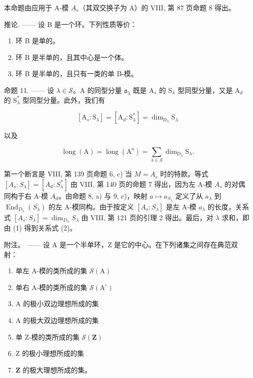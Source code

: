 本命题由应用于 A-模 \(A_{s}\)（其双交换子为 A）的 VIII, 第 87 页命题 8 得出。

推论. —— 设 B 是一个环。下列性质等价：

\begin{enumerate}
\def\labelenumi{(\roman{enumi})}
\item
  环 B 是单的。
\item
  环 B 是半单的，且其中心是一个体。
\item
  环 B 是半单的，且只有一类的单 B-模。
\end{enumerate}

命题 11. —— 设 \(\lambda \in \mathcal{S}\)。A 的同型分量 \(\mathfrak{a}_{\lambda}\) 既是 \(\mathrm{A}_s\) 的 \(\mathrm{S}_{\lambda}\) 型同型分量，又是 \(\mathrm{A}_d\) 的 \(\mathrm{S}_{\lambda}^{*}\) 型同型分量。此外，我们有

\[
[ \mathrm{A} _ {s}: \mathrm{S} _ {\lambda} ] = [ \mathrm{A} _ {d}: \mathrm{S} _ {\lambda} ^ {*} ] = \dim_ {\mathrm{D} _ {\lambda}} \mathrm{S} _ {\lambda}\tag{1}
\]

以及

\[
\operatorname{long} (\mathrm{A}) = \operatorname{long} \left(\mathrm{A} ^ {\mathrm{o}}\right) = \sum_ {\lambda \in \mathscr {S}} \dim_ {\mathrm{D} _ {\lambda}} \mathrm{S} _ {\lambda}.\tag{2}
\]

第一个断言是 VIII, 第 139 页命题 6, c) 当 \(M = A_{s}\) 时的特款。等式 \([A_{s} : S_{\lambda}] = [A_{d} : S_{\lambda}^{*}]\) 由 VIII, 第 140 页的命题 7 得出，因为左 A-模 \(A_{s}\) 的对偶同构于右 A-模 \(A_{d}\)。由命题 8, a) 与 9, c)，映射 \(a \mapsto a_{S_{\lambda}}\) 定义了从 \(a_{\lambda}\) 到 \(\operatorname{End}_{D_{\lambda}}(S_{\lambda})\) 的左 A-模同构。由于按定义 \([A_{s} : S_{\lambda}]\) 是左 A-模 \(a_{\lambda}\) 的长度，关系式 \([A_{s} : S_{\lambda}] = \dim_{D_{\lambda}} S_{\lambda}\) 由 VIII, 第 121 页的引理 2 得出。最后，对 \(\lambda\) 求和，即由 (1) 得到关系式 (2)。

附注。 —— 设 A 是一个半单环，Z 是它的中心。在下列诸集之间存在典范双射：

\begin{enumerate}
\def\labelenumi{\alph{enumi})}
\item
  单左 A-模的类所成的集 \(\mathcal{S}(\mathrm{A})\)
\item
  单右 A-模的类所成的集 \(\mathcal{S}(\mathrm{A}^{\circ})\)
\item
  A 的极小双边理想所成的集
\item
  A 的极大双边理想所成的集
\item
  单 Z-模的类所成的集 \(\mathcal{S}(\mathbf{Z})\)
\item
  Z 的极小理想所成的集
\item
  \(\mathbf{Z}\) 的极大理想所成的集。
\end{enumerate}

